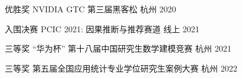 


\begin{cvhonors}
\cvhonor
  {优胜奖} %
  {NVIDIA GTC 第三届黑客松} %
  {杭州} %
  {2020} %

\cvhonor
  {入围决赛} %
  {PCIC 2021: 因果推断与推荐赛道} %
  {线上} %
  {2021} %

\cvhonor
  {三等奖} %
  {“华为杯” 第十八届中国研究生数学建模竞赛} %
  {杭州} %
  {2021} %


\cvhonor
  {三等奖} %
  {第五届全国应用统计专业学位研究生案例大赛} %
  {杭州} %
  {2022} %

\end{cvhonors}

